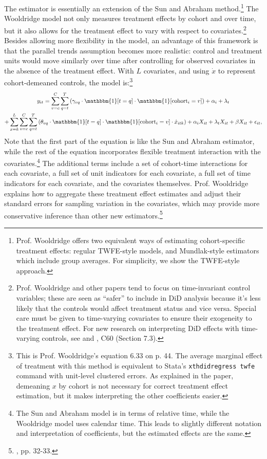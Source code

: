 \documentclass[12pt]{article}
\begin{document}
The \citet{wooldridge2021two} estimator is essentially an extension of the Sun and Abraham method.\footnote{Prof. Wooldridge offers two equivalent ways of estimating cohort-specific treatment effects: regular TWFE-style models, and Mundlak-style estimators which include group averages. For simplicity, we show the TWFE-style approach.}  The Wooldridge model not only measures treatment effects by cohort and over time, but it also allows for the treatment effect to vary with respect to covariates.\footnote{Prof. Wooldridge and other papers tend to focus on time-invariant control variables; these are seen as “safer” to include in DiD analysis because it’s less likely that the controls would affect treatment status and vice versa. Special care must be given to time-varying covariates to ensure their exogeneity to the treatment effect. For new research on interpreting DiD effects with time-varying controls, see \citet{caetano2023} and \citet{wooldridge2023nonlinear}, C60 (Section 7.3).} Besides allowing more flexibility in the model, an advantage of this framework is that the parallel trends assumption becomes more realistic: control and treatment units would move similarly over time after controlling for observed covariates in the absence of the treatment effect. With $L$ covariates, and using $\dot{x}$ to represent cohort-demeaned controls, the model is:\footnote{This is Prof. Wooldridge’s equation 6.33 on p. 44. The average marginal effect of treatment with this method is equivalent to Stata’s \texttt{xthdidregress twfe} command with unit-level clustered errors. As explained in the paper, demeaning $x$ by cohort is not necessary for correct treatment effect estimation, but it makes interpreting the other coefficients easier.}
\begin{multline}
    y_{it} = \sum_{v=c}^C\sum_{q=t}^T\left(\gamma_{vq}\cdot\mathbbm{1}[t=q]\cdot \mathbbm{1}[\text{cohort}_i=v]\right) + \alpha_i + \lambda_t \\
    + \sum_{x=k}^L\sum_{v=c}^C\sum_{q=t}^T\left(\theta_{vq}\cdot \mathbbm{1}[t=q]\cdot \mathbbm{1}[\text{cohort}_i=v] \cdot \dot{x}_{itk}\right) + \alpha_i X_{it} + \lambda_t X_{it} + \beta X_{it} +\epsilon_{it},
\end{multline}
Note that the first part of the equation is like the Sun and Abraham estimator, while the rest of the equation incorporates flexible treatment interaction with the covariates.\footnote{The Sun and Abraham model is in terms of relative time, while the Wooldridge model uses calendar time. This leads to slightly different notation and interpretation of coefficients, but the estimated effects are the same.}  The additional terms include a set of cohort-time interactions for each covariate, a full set of unit indicators for each covariate, a full set of time indicators for each covariate, and the covariates themselves. Prof. Wooldridge explains how to aggregate these treatment effect estimates and adjust their standard errors for sampling variation in the covariates, which may provide more conservative inference than other new estimators.\footnote{\citet{wooldridge2021two}, pp. 32-33.}
\end{document}
